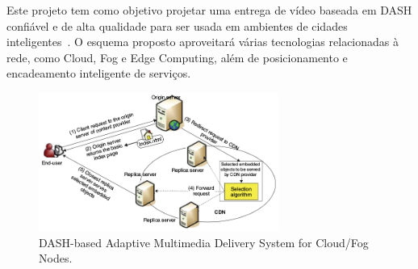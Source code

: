Este projeto tem como objetivo projetar uma entrega de vídeo baseada em DASH confiável e de alta qualidade para ser usada em ambientes de cidades inteligentes~\cite{gamaUCC2019, KreuzbergerWorkshop2016}. O esquema proposto aproveitará várias tecnologias relacionadas à rede, como Cloud, Fog e Edge Computing, além de posicionamento e encadeamento inteligente de serviços.%


\vspace{0.8cm}
\begin{figure}[htpb]
	\centering
	\includegraphics[width=0.7\textwidth]{img/fig-intro.png}
	\caption{DASH-based Adaptive Multimedia Delivery System for Cloud/Fog Nodes.}
	\label{fig:scenario-arch}
\end{figure}


